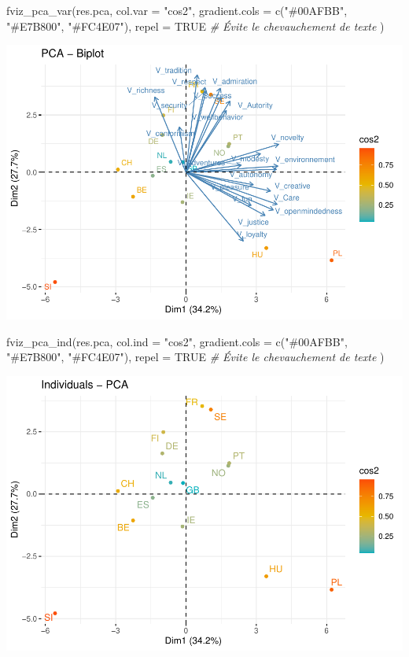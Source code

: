 \documentclass[
]{book}
\newenvironment{Shaded}{\begin{snugshade}}{\end{snugshade}}
\newcommand{\AttributeTok}[1]{\textcolor[rgb]{0.77,0.63,0.00}{#1}}
\newcommand{\CommentTok}[1]{\textcolor[rgb]{0.56,0.35,0.01}{\textit{#1}}}
\newcommand{\ConstantTok}[1]{\textcolor[rgb]{0.00,0.00,0.00}{#1}}
\newcommand{\FunctionTok}[1]{\textcolor[rgb]{0.00,0.00,0.00}{#1}}
\newcommand{\NormalTok}[1]{#1}
\newcommand{\StringTok}[1]{\textcolor[rgb]{0.31,0.60,0.02}{#1}}
\begin{document}
\begin{Shaded}
\begin{Highlighting}[]
\FunctionTok{fviz\_pca\_var}\NormalTok{(res.pca, }\AttributeTok{col.var =} \StringTok{"cos2"}\NormalTok{,}
             \AttributeTok{gradient.cols =} \FunctionTok{c}\NormalTok{(}\StringTok{"\#00AFBB"}\NormalTok{, }\StringTok{"\#E7B800"}\NormalTok{, }\StringTok{"\#FC4E07"}\NormalTok{),}
             \AttributeTok{repel =} \ConstantTok{TRUE} \CommentTok{\# Évite le chevauchement de texte}
\NormalTok{             )}
\end{Highlighting}
\end{Shaded}

\includegraphics{bookdown-demo_files/figure-latex/0609-2.pdf}

\begin{Shaded}
\begin{Highlighting}[]
\FunctionTok{fviz\_pca\_ind}\NormalTok{(res.pca, }\AttributeTok{col.ind =} \StringTok{"cos2"}\NormalTok{,}
             \AttributeTok{gradient.cols =} \FunctionTok{c}\NormalTok{(}\StringTok{"\#00AFBB"}\NormalTok{, }\StringTok{"\#E7B800"}\NormalTok{, }\StringTok{"\#FC4E07"}\NormalTok{),}
             \AttributeTok{repel =} \ConstantTok{TRUE} \CommentTok{\# Évite le chevauchement de texte}
\NormalTok{             )}
\end{Highlighting}
\end{Shaded}

\includegraphics{bookdown-demo_files/figure-latex/0609-3.pdf}
\end{document}
